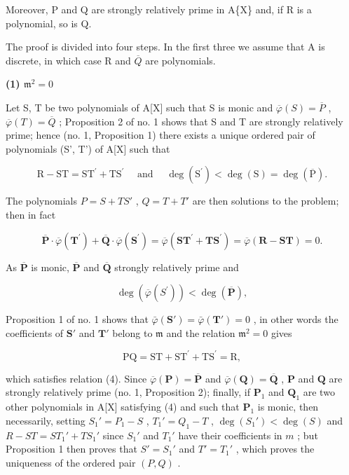 Moreover, P and Q are strongly relatively prime in A\{X\} and, if R is a polynomial, so is Q.

The proof is divided into four steps. In the first three we assume that A is discrete, in which case R and \(\overline{Q}\) are polynomials.

\textbf{(1) \(\mathfrak{m}^2 = 0\)}\par

Let S, T be two polynomials of A{[}X{]} such that S is monic and \(\overline{\varphi}(S) = \overline{P}\) , \(\overline{\varphi}(T) = \overline{Q}\) ; Proposition 2 of no. 1 shows that S and T are strongly relatively prime; hence (no. 1, Proposition 1) there exists a unique ordered pair of polynomials (S', T') of A{[}X{]} such that

\[
\mathrm{R} - \mathrm{ST} = \mathrm{ST} ^ {\prime} + \mathrm{TS} ^ {\prime} \quad \text { and } \quad \deg (\mathrm{S} ^ {\prime}) <   \deg (\mathrm{S}) = \deg (\overline {{\mathrm{P}}}).\tag{5}
\]

The polynomials \(P = S + TS'\) , \(Q = T + T'\) are then solutions to the problem; then in fact

\[
\overline {{{\mathbf {P}}}} \cdot \overline {{{\varphi}}} (\mathbf {T} ^ {\prime}) + \overline {{{\mathbf {Q}}}} \cdot \overline {{{\varphi}}} (\mathbf {S} ^ {\prime}) = \overline {{{\varphi}}} (\mathbf {S T} ^ {\prime} + \mathbf {T S} ^ {\prime}) = \overline {{{\varphi}}} (\mathbf {R} - \mathbf {S T}) = 0.\tag{6}
\]

As \(\overline{\mathbf{P}}\) is monic, \(\overline{\mathbf{P}}\) and \(\overline{\mathbf{Q}}\) strongly relatively prime and

\[
\deg (\overline {{{\varphi}}} (S ^ {\prime})) <   \deg (\overline {{{\mathbf {P}}}}),
\]

Proposition 1 of no. 1 shows that \(\bar{\varphi}(\mathbf{S}') = \bar{\varphi}(\mathbf{T}') = 0\) , in other words the coefficients of \(\mathbf{S}'\) and \(\mathbf{T}'\) belong to \(\mathfrak{m}\) and the relation \(\mathfrak{m}^2 = 0\) gives

\[
\mathrm{PQ} = \mathrm{ST} + \mathrm{ST} ^ {\prime} + \mathrm{TS} ^ {\prime} = \mathrm{R},
\]

which satisfies relation (4). Since \(\overline{\varphi}(\mathbf{P}) = \overline{\mathbf{P}}\) and \(\overline{\varphi}(\mathbf{Q}) = \overline{\mathbf{Q}}\) , \(\mathbf{P}\) and \(\mathbf{Q}\) are strongly relatively prime (no. 1, Proposition 2); finally, if \(\mathbf{P}_1\) and \(\mathbf{Q}_1\) are two other polynomials in A{[}X{]} satisfying (4) and such that \(\mathbf{P}_1\) is monic, then necessarily, setting \(S_1' = P_1 - S\) , \(T_1' = Q_1 - T\) , \(\deg(S_1') < \deg(S)\) and \(R - ST = ST_1' + TS_1'\) since \(S_1'\) and \(T_1'\) have their coefficients in \(m\) ; but Proposition 1 then proves that \(S' = S_1'\) and \(T' = T_1'\) , which proves the uniqueness of the ordered pair \((P, Q)\) .

